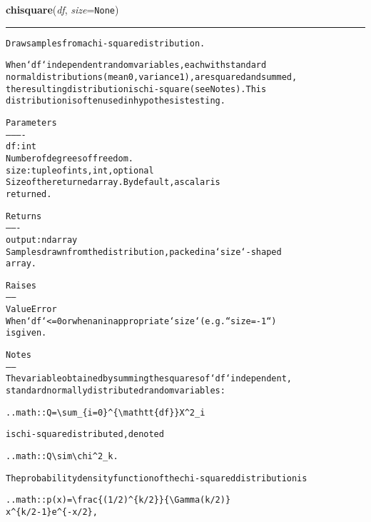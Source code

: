     \label{trunk:qstkutil:bollinger:chisquare}

    \vspace{0.5ex}

\hspace{.8\funcindent}\begin{boxedminipage}{\funcwidth}

    \raggedright \textbf{chisquare}(\textit{df}, \textit{size}={\tt None})

    \vspace{-1.5ex}

    \rule{\textwidth}{0.5\fboxrule}
\setlength{\parskip}{2ex}
\begin{alltt}
Draw samples from a chi-square distribution.

When `df` independent random variables, each with standard
normal distributions (mean 0, variance 1), are squared and summed,
the resulting distribution is chi-square (see Notes).  This
distribution is often used in hypothesis testing.

Parameters
----------
df : int
     Number of degrees of freedom.
size : tuple of ints, int, optional
     Size of the returned array.  By default, a scalar is
     returned.

Returns
-------
output : ndarray
    Samples drawn from the distribution, packed in a `size`-shaped
    array.

Raises
------
ValueError
    When `df` {\textless}= 0 or when an inappropriate `size` (e.g. ``size=-1``)
    is given.

Notes
-----
The variable obtained by summing the squares of `df` independent,
standard normally distributed random variables:

.. math:: Q = {\textbackslash}sum\_\{i=0\}{\textasciicircum}\{{\textbackslash}mathtt\{df\}\} X{\textasciicircum}2\_i

is chi-square distributed, denoted

.. math:: Q {\textbackslash}sim {\textbackslash}chi{\textasciicircum}2\_k.

The probability density function of the chi-squared distribution is

.. math:: p(x) = {\textbackslash}frac\{(1/2){\textasciicircum}\{k/2\}\}\{{\textbackslash}Gamma(k/2)\}
                 x{\textasciicircum}\{k/2 - 1\} e{\textasciicircum}\{-x/2\},


\end{alltt}
\end{boxedminipage}
